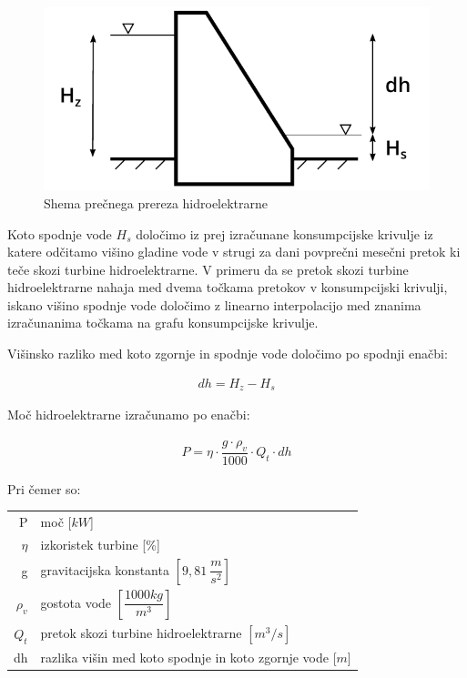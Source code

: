 \begin{figure}[ht!]
	\begin{centering}
		\includegraphics{slike/electricityProduction/powerplant_crossSection.pdf}
		\caption{Shema prečnega prereza hidroelektrarne}
	\end{centering}
\end{figure}

 Koto spodnje vode $H_s$ določimo iz prej izračunane konsumpcijske krivulje iz katere odčitamo višino gladine vode v strugi za dani povprečni mesečni pretok ki teče skozi turbine hidroelektrarne. V primeru da se pretok skozi turbine hidroelektrarne nahaja med dvema točkama pretokov v konsumpcijski krivulji, iskano višino spodnje vode določimo z linearno interpolacijo med znanima izračunanima točkama na grafu konsumpcijske krivulje.


Višinsko razliko med koto zgornje in spodnje vode določimo po spodnji enačbi:

\begin{ceqn}
\begin{align}
dh = H_z - H_s
\end{align}
\end{ceqn}

Moč hidroelektrarne izračunamo po enačbi:

\begin{ceqn}
\begin{align}
P = \eta \cdot \dfrac{g \cdot \rho_v}{1000} \cdot Q_t \cdot dh \label{eq:mocHidroelektrarne}
\end{align}
\end{ceqn}

Pri čemer so:
\begin{table}[htb!]
	\begin{tabular}{r|p{10cm}}
		P & moč [$kW$]\\
		$\eta$ & izkoristek turbine [\%]\\
		g & gravitacijska konstanta $\left[9,81~\dfrac{m}{s^{2}}\right]$ \\
		$\rho_v$&gostota vode $\left[\dfrac{1000 kg}{m^3}\right]$\\
		$Q_t$ & pretok skozi turbine hidroelektrarne $\left[m^{3}/s \right]$\\
		dh & razlika višin med koto spodnje in koto zgornje vode [$m$]
	\end{tabular}
\end{table}



